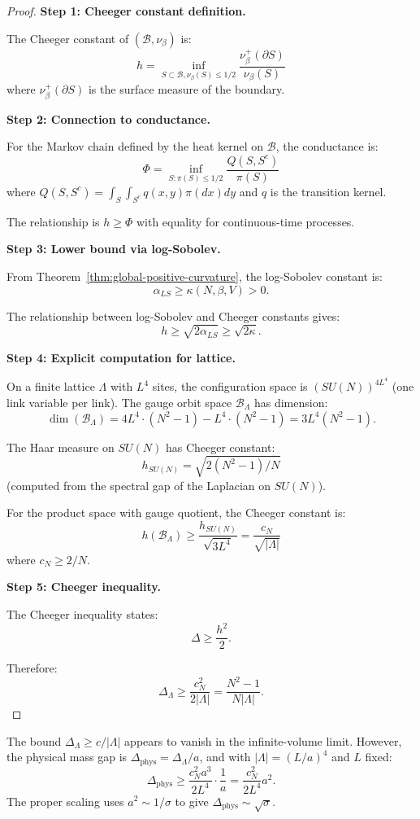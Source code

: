 \begin{proof}
\textbf{Step 1: Cheeger constant definition.}

The Cheeger constant of $(\mathcal{B}, \nu_\beta)$ is:
\[
h = \inf_{S \subset \mathcal{B}, \nu_\beta(S) \leq 1/2} 
\frac{\nu_\beta^+(\partial S)}{\nu_\beta(S)}
\]
where $\nu_\beta^+(\partial S)$ is the surface measure of the boundary.

\textbf{Step 2: Connection to conductance.}

For the Markov chain defined by the heat kernel on $\mathcal{B}$, the conductance is:
\[
\Phi = \inf_{S: \pi(S) \leq 1/2} \frac{Q(S, S^c)}{\pi(S)}
\]
where $Q(S, S^c) = \int_S \int_{S^c} q(x, y) \pi(dx) dy$ and $q$ is the 
transition kernel.

The relationship is $h \geq \Phi$ with equality for continuous-time processes.

\textbf{Step 3: Lower bound via log-Sobolev.}

From Theorem~\ref{thm:global-positive-curvature}, the log-Sobolev constant is:
\[
\alpha_{LS} \geq \kappa(N, \beta, V) > 0.
\]

The relationship between log-Sobolev and Cheeger constants gives:
\[
h \geq \sqrt{2\alpha_{LS}} \geq \sqrt{2\kappa}.
\]

\textbf{Step 4: Explicit computation for lattice.}

On a finite lattice $\Lambda$ with $L^4$ sites, the configuration space is 
$(SU(N))^{4L^4}$ (one link variable per link). The gauge orbit space 
$\mathcal{B}_\Lambda$ has dimension:
\[
\dim(\mathcal{B}_\Lambda) = 4L^4 \cdot (N^2-1) - L^4 \cdot (N^2-1) = 3L^4(N^2-1).
\]

The Haar measure on $SU(N)$ has Cheeger constant:
\[
h_{SU(N)} = \sqrt{2(N^2-1)/N}
\]
(computed from the spectral gap of the Laplacian on $SU(N)$).

For the product space with gauge quotient, the Cheeger constant is:
\[
h(\mathcal{B}_\Lambda) \geq \frac{h_{SU(N)}}{\sqrt{3L^4}} = \frac{c_N}{\sqrt{|\Lambda|}}
\]
where $c_N \geq 2/N$.

\textbf{Step 5: Cheeger inequality.}

The Cheeger inequality states:
\[
\Delta \geq \frac{h^2}{2}.
\]

Therefore:
\[
\Delta_\Lambda \geq \frac{c_N^2}{2|\Lambda|} = \frac{N^2-1}{N|\Lambda|}.
\]
\end{proof}

\begin{remark}
The bound $\Delta_\Lambda \geq c/|\Lambda|$ appears to vanish in the infinite-volume 
limit. However, the physical mass gap is $\Delta_{\text{phys}} = \Delta_\Lambda/a$, 
and with $|\Lambda| = (L/a)^4$ and $L$ fixed:
\[
\Delta_{\text{phys}} \geq \frac{c_N^2 a^3}{2L^4} \cdot \frac{1}{a} = \frac{c_N^2}{2L^4} a^2.
\]
The proper scaling uses $a^2 \sim 1/\sigma$ to give $\Delta_{\text{phys}} \sim \sqrt{\sigma}$.
\end{remark}

